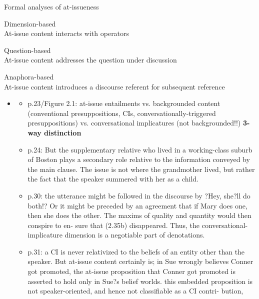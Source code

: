 \documentclass[11pt,fleqn]{article}
\newcommand{\6}{\mbox{$[\hspace*{-.6mm}[$}}
\newcommand{\9}{\mbox{$]\hspace*{-.6mm}]$}}
\begin{document}
\begin{exe}
\ex Formal analyses of at-issueness

\begin{xlist}
\ex Dimension-based \\ At-issue content interacts with operators

\ex Question-based \\ At-issue content addresses the question under discussion

\ex Anaphora-based \\ At-issue content introduces a discourse referent for subsequent reference

\end{xlist}
\end{exe}


\begin{itemize}

\item \citealt{potts05}

\begin{itemize}

\item p.23/Figure 2.1: at-issue entailments vs. backgrounded content (conventional presuppositions, CIs, conversationally-triggered presuppositions) vs. conversational implicatures (not backgrounded!!) {\bf 3-way distinction}

\item p.24: But the supplementary relative who lived in a working-class suburb of Boston plays a secondary role relative to the information conveyed by the main clause. The issue is not where the grandmother lived, but rather the fact that the speaker summered with her as a child.

\item p.30: the utterance might be followed in the discourse by ?Hey, she?ll do both!? Or it might be preceded by an agreement that if Mary does one, then she does the other. The maxims of quality and quantity would then conspire to en- sure that (2.35b) disappeared. Thus, the conversational-implicature dimension is a negotiable part of denotations.

\item p.31: a CI is never relativized to the beliefs of an entity other than the speaker. But at-issue content certainly is; in Sue wrongly believes Conner got promoted, the at-issue proposition that Conner got promoted is asserted to hold only in Sue?s belief worlds. this embedded proposition is not speaker-oriented, and hence not classifiable as a CI contri- bution,


\end{itemize}
\end{itemize}
\end{document}
